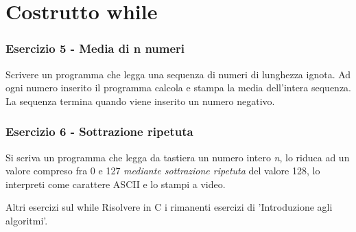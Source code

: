 \documentclass[format=169]{beamer}
\begin{document}
\section{Costrutto while}
\begin{frame}
\frametitle{Esercizio 5 - Media di n numeri}
Scrivere un programma che legga una sequenza di numeri di lunghezza ignota. Ad ogni numero inserito il programma calcola e stampa la media dell'intera sequenza. La sequenza termina quando viene inserito un numero negativo.
\end{frame}

\begin{frame}
\frametitle{Esercizio 6 - Sottrazione ripetuta}
Si scriva un programma che legga da tastiera un numero intero \emph{n}, lo riduca ad un valore compreso fra 0 e 127 \emph{mediante sottrazione ripetuta} del valore 128, lo interpreti come carattere ASCII e lo stampi a video.
\end{frame}

\begin{frame}{Altri esercizi sul while}
Risolvere in C i rimanenti esercizi di 'Introduzione agli algoritmi'.
\end{frame}
\end{document}
